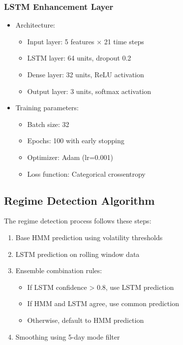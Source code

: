 \subsubsection{LSTM Enhancement Layer}
\begin{itemize}
    \item Architecture:
        \begin{itemize}
            \item Input layer: 5 features × 21 time steps
            \item LSTM layer: 64 units, dropout 0.2
            \item Dense layer: 32 units, ReLU activation
            \item Output layer: 3 units, softmax activation
        \end{itemize}
    \item Training parameters:
        \begin{itemize}
            \item Batch size: 32
            \item Epochs: 100 with early stopping
            \item Optimizer: Adam (lr=0.001)
            \item Loss function: Categorical crossentropy
        \end{itemize}
\end{itemize}

\subsection{Regime Detection Algorithm}
The regime detection process follows these steps:

\begin{enumerate}
    \item Base HMM prediction using volatility thresholds
    \item LSTM prediction on rolling window data
    \item Ensemble combination rules:
        \begin{itemize}
            \item If LSTM confidence > 0.8, use LSTM prediction
            \item If HMM and LSTM agree, use common prediction
            \item Otherwise, default to HMM prediction
        \end{itemize}
    \item Smoothing using 5-day mode filter
\end{enumerate}

